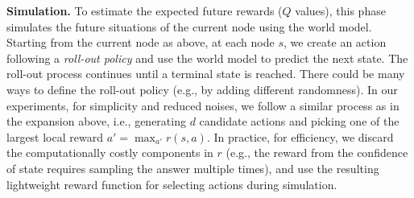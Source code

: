 

\noindent \textbf{Simulation.}
To estimate the expected future rewards ($Q$ values), this phase simulates the future situations of the current node using the world model.
Starting from the current node as above, at each node $s$, we create an action following a \emph{roll-out policy} and use the world model to predict the next state. The roll-out process continues until a terminal state is reached. There could be many ways to define the roll-out policy (e.g., by adding different randomness). In our experiments, for simplicity and reduced noises, we follow a similar process as in the expansion above, i.e., generating $d$ candidate actions and picking one of the largest local reward $a'= \max_{a'} r(s, a)$. In practice, for efficiency, we discard the computationally costly components in $r$ (e.g., the reward from the confidence of state requires sampling the answer multiple times), and use the resulting lightweight reward function for selecting actions during simulation.



